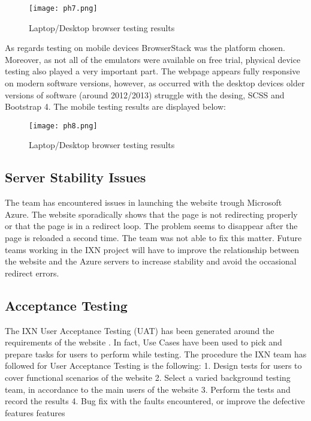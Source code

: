 \begin{figure}[H]
      \centering
      \texttt{[image: ph7.png]}
      \caption{Laptop/Desktop browser testing results}
 \end{figure}

As regards testing on mobile devices BrowserStack was the platform
chosen. Moreover, as not all of the emulators were available on free
trial, physical device testing also played a very important part. The
webpage appears fully responsive on modern software versions, however,
as occurred with the desktop devices older versions of software (around
2012/2013) struggle with the desing, SCSS and Bootstrap 4. The mobile
testing results are displayed below:

\begin{figure}[H]
      \centering
      \texttt{[image: ph8.png]}
      \caption{Laptop/Desktop browser testing results}
 \end{figure}

\hypertarget{server-stability-issues}{%
\subsection{Server Stability Issues}\label{server-stability-issues}}

The team has encountered issues in launching the website trough
Microsoft Azure. The website sporadically shows that the page is not
redirecting properly or that the page is in a redirect loop. The problem
seems to disappear after the page is reloaded a second time. The team
was not able to fix this matter. Future teams working in the IXN project
will have to improve the relationship between the website and the Azure
servers to increase stability and avoid the occasional redirect errors.

\hypertarget{acceptance-testing}{%
\subsection{Acceptance Testing}\label{acceptance-testing}}

The IXN User Acceptance Testing (UAT) has been generated around the
requirements of the website \cite{g7} . In fact, Use Cases have been
used to pick and prepare tasks for users to perform while testing. The
procedure the IXN team has followed for User Acceptance Testing is the
following: 1. Design tests for users to cover functional scenarios of
the website 2. Select a varied background testing team, in accordance to
the main users of the website 3. Perform the tests and record the
results 4. Bug fix with the faults encountered, or improve the defective
features features


